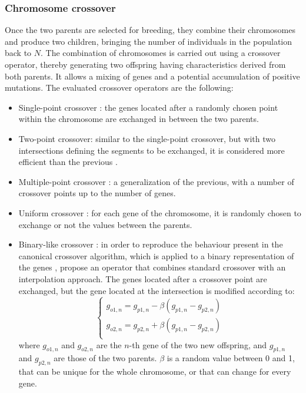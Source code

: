 \documentclass{ametsoc}
\begin{document}
\subsubsection{Chromosome crossover}
\label{sec:gas:crossover}

Once the two parents are selected for breeding, they combine their chromosomes and produce two children, bringing the number of individuals in the population back to $N$. The combination of chromosomes is carried out using a crossover operator, thereby generating two offspring having characteristics derived from both parents. It allows a mixing of genes and a potential accumulation of positive mutations. The evaluated crossover operators are the following:

\begin{itemize}
	\item Single-point crossover \citep{Goldberg1989}: the genes located after a randomly chosen point within the chromosome are exchanged in between the two parents.
	
	\item Two-point crossover: similar to the single-point crossover, but with two intersections defining the segments to be exchanged, it is considered more efficient than the previous \citep{Beasley1993a}.
	
	\item Multiple-point crossover \citep{DeJong1975a}: a generalization of the previous, with a number of crossover points up to the number of genes.
	
	\item Uniform crossover \citep{Syswerda1989}: for each gene of the chromosome, it is randomly chosen to exchange or not the values between the parents.
	
	\item Binary-like crossover \citep{Haupt2004}: in order to reproduce the behaviour present in the canonical crossover algorithm, which is applied to a binary representation of the genes \citep{Goldberg1989, Goldberg1990a, Herrera1998a}, \citet{Haupt2004} propose an operator that combines standard crossover with an interpolation approach. The genes located after a crossover point are exchanged, but the gene located at the intersection is modified according to:
	\begin{equation}
	\left\lbrace \begin{array}{l} 
	g_{o1,n} = g_{p1,n} - \beta (g_{p1,n} - g_{p2,n}) \\
	g_{o2,n} = g_{p2,n} + \beta (g_{p1,n} - g_{p2,n}) \\
	\end{array} \right.
	\label{equation_mating_as_binary}
	\end{equation}
	where $g_{o1,n}$ and $g_{o2,n}$ are the $n$-th gene of the two new offspring, and $g_{p1,n}$ and $g_{p2,n}$ are those of the two parents. $\beta$ is a random value between 0 and 1, that can be unique for the whole chromosome, or that can change for every gene.
	

\end{itemize}
\end{document}

